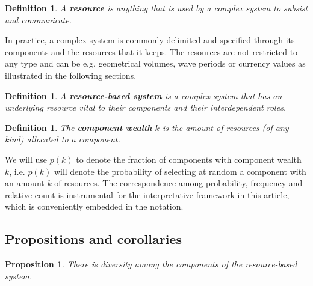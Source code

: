 \documentclass[10pt,letterpaper]{article}
\newtheorem{proposition}[theorem]{Proposition}
\newtheorem{definition2}[theorem3]{Definition}
\begin{document}

\begin{definition2}
	A {\bf resource} is anything that is used by a complex system to subsist and communicate.
\end{definition2}

In practice, a complex system is commonly delimited and specified through its components and the resources that it keeps. The resources are not restricted to any type and can be e.g. geometrical volumes, wave periods or currency values as illustrated in the following sections.

\begin{definition2}
	A {\bf resource-based system} is a complex system that has an underlying resource vital to their components and their interdependent roles.
\end{definition2}


\begin{definition2}
	The {\bf component wealth} $k$ is the amount of resources (of any kind) allocated to a component.
\end{definition2}

We will use $p(k)$ to denote the fraction of components with component wealth $k$,
i.e. $p(k)$ will denote the probability of selecting at random a component with an amount $k$ of resources.
The correspondence among probability, frequency and relative count is
instrumental for the interpretative framework in this article,
which is conveniently embedded in the notation.

\subsection{Propositions and corollaries}\label{propCol}
\setcounter{theorem}{-1}
\begin{proposition}\label{prop:0}
	There is diversity among the components of the resource-based system.
\end{proposition}
\end{document}
